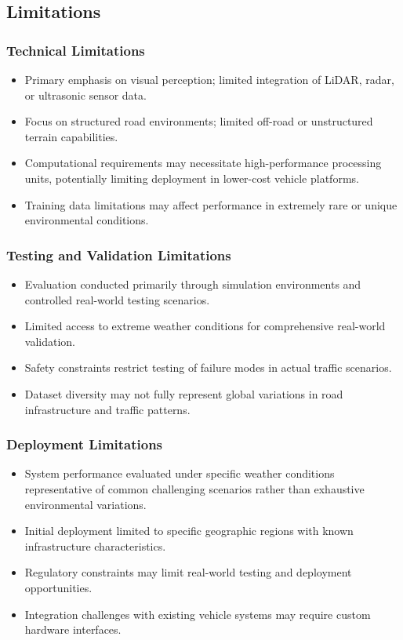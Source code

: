 \subsection{Limitations}

\subsubsection*{Technical Limitations}
\begin{itemize}
    \item Primary emphasis on visual perception; limited integration of LiDAR, radar, or ultrasonic sensor data.
    \item Focus on structured road environments; limited off-road or unstructured terrain capabilities.
    \item Computational requirements may necessitate high-performance processing units, potentially limiting deployment in lower-cost vehicle platforms.
    \item Training data limitations may affect performance in extremely rare or unique environmental conditions.
\end{itemize}

\subsubsection*{Testing and Validation Limitations}
\begin{itemize}
    \item Evaluation conducted primarily through simulation environments and controlled real-world testing scenarios.
    \item Limited access to extreme weather conditions for comprehensive real-world validation.
    \item Safety constraints restrict testing of failure modes in actual traffic scenarios.
    \item Dataset diversity may not fully represent global variations in road infrastructure and traffic patterns.
\end{itemize}

\subsubsection*{Deployment Limitations}
\begin{itemize}
    \item System performance evaluated under specific weather conditions representative of common challenging scenarios rather than exhaustive environmental variations.
    \item Initial deployment limited to specific geographic regions with known infrastructure characteristics.
    \item Regulatory constraints may limit real-world testing and deployment opportunities.
    \item Integration challenges with existing vehicle systems may require custom hardware interfaces.
\end{itemize}


